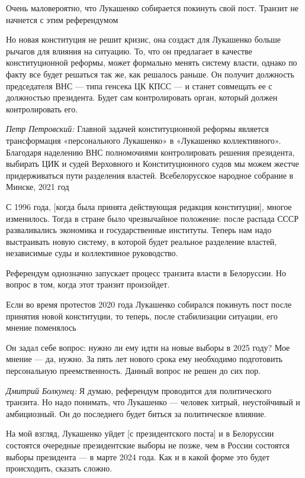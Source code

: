 \begin{fancyquotes}
    Очень маловероятно, что Лукашенко собирается покинуть свой пост. Транзит не начнется с этим референдумом
\end{fancyquotes}

Но новая конституция не решит кризис, она создаст для Лукашенко больше рычагов для влияния на ситуацию. То, что он предлагает в качестве конституционной реформы, может формально менять систему власти, однако по факту все будет решаться так же, как решалось раньше. Он получит должность председателя ВНС — типа генсека ЦК КПСС — и станет совмещать ее с должностью президента. Будет сам контролировать орган, который должен контролировать его.



\textit{Петр Петровский:} Главной задачей конституционной реформы является трансформация «персонального Лукашенко» в «Лукашенко коллективного». Благодаря наделению ВНС полномочиями контролировать решения президента, выбирать ЦИК и судей Верховного и Конституционного судов мы можем жестче придерживаться пути разделения властей.
Всебелорусское народное собрание в Минске, 2021 год

С 1996 года, [когда была принята действующая редакция конституции], многое изменилось. Тогда в стране было чрезвычайное положение: после распада СССР разваливались экономика и государственные институты. Теперь нам надо выстраивать новую систему, в которой будет реальное разделение властей, независимые суды и коллективное руководство.

Референдум однозначно запускает процесс транзита власти в Белоруссии. Но вопрос в том, когда этот транзит произойдет.


\begin{fancyquotes}
    Если во время протестов 2020 года Лукашенко собирался покинуть пост после принятия новой конституции, то теперь, после стабилизации ситуации, его мнение поменялось
\end{fancyquotes}

Он задал себе вопрос: нужно ли ему идти на новые выборы в 2025 году? Мое мнение — да, нужно. За пять лет нового срока ему необходимо подготовить персональную преемственность. Данный вопрос не решен до сих пор.


\textit{Дмитрий Болкунец:} Я думаю, референдум проводится для политического транзита. Но надо понимать, что Лукашенко — человек хитрый, неустойчивый и амбициозный. Он до последнего будет биться за политическое влияние.

На мой взгляд, Лукашенко уйдет [с президентского поста] и в Белоруссии состоятся очередные президентские выборы не позже, чем в России состоятся выборы президента — в марте 2024 года. Как и в какой форме это будет происходить, сказать сложно.

